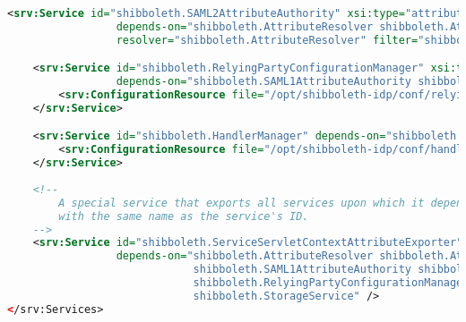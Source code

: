 \begin{lstlisting}[language=xml]
    <srv:Service id="shibboleth.SAML2AttributeAuthority" xsi:type="attribute-authority:SAML2AttributeAuthority" 
                 depends-on="shibboleth.AttributeResolver shibboleth.AttributeFilterEngine" 
                 resolver="shibboleth.AttributeResolver" filter="shibboleth.AttributeFilterEngine"/>

    <srv:Service id="shibboleth.RelyingPartyConfigurationManager" xsi:type="relyingParty:SAMLMDRelyingPartyConfigurationManager" 
                 depends-on="shibboleth.SAML1AttributeAuthority shibboleth.SAML2AttributeAuthority">
        <srv:ConfigurationResource file="/opt/shibboleth-idp/conf/relying-party.xml" xsi:type="resource:FilesystemResource"/>
    </srv:Service>

    <srv:Service id="shibboleth.HandlerManager" depends-on="shibboleth.RelyingPartyConfigurationManager" xsi:type="profile:IdPProfileHandlerManager">
        <srv:ConfigurationResource file="/opt/shibboleth-idp/conf/handler.xml" xsi:type="resource:FilesystemResource"/>
    </srv:Service>
    
    <!-- 
        A special service that exports all services upon which it depends into the ServletContext as an attribute 
        with the same name as the service's ID.
    -->
    <srv:Service id="shibboleth.ServiceServletContextAttributeExporter" xsi:type="srv:ServletContextAttributeExporter"
                 depends-on="shibboleth.AttributeResolver shibboleth.AttributeFilterEngine 
                             shibboleth.SAML1AttributeAuthority shibboleth.SAML2AttributeAuthority
                             shibboleth.RelyingPartyConfigurationManager shibboleth.HandlerManager 
                             shibboleth.StorageService" />
</srv:Services>
\end{lstlisting}

